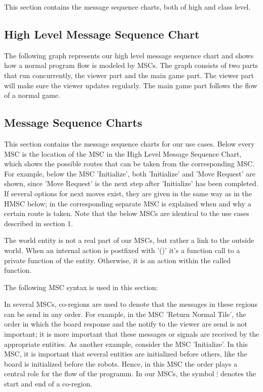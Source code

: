 This section contains the message sequence charts, both of high and class level.
\subsection{High Level Message Sequence Chart}
	
	\begin{minipage}{\linewidth}
		The following graph represents our high level message sequence chart and shows how a normal program flow is modeled by MSCs. The graph consists of two parts that run concurrently, the viewer part and the main game part. The viewer part will make sure the viewer updates regularly. The main game part follows the flow of a normal game.
		
			
	\end{minipage}
	\newpage
\subsection{Message Sequence Charts}
	This section contains the message sequence charts for our use cases. Below every MSC is the location of the MSC in the High Level Message Sequence Chart, which shows the possible routes that can be taken from the corresponding MSC. For example, below the MSC 'Initialize', both 'Initialize' and 'Move Request' are shown, since 'Move Request' is the next step after 'Initialize' has been completed. If several options for next moves exist, they are given in the same way as in the HMSC below; in the corresponding separate MSC is explained when and why a certain route is taken. Note that the below MSCs are identical to the use cases described in section 1.

	The world entity is not a real part of our MSCs, but rather a link to the outside world. When an internal action is postfixed with '()' it's a function call to a private function of the entity. Otherwise, it is an action within the called function.

	The following MSC syntax is used in this section:

	

	In several MSCs, co-regions are used to denote that the messages in these regions can be send in any order. For example, in the MSC 'Return Normal Tile', the order in which the board response and the notify to the viewer are send is not important; it is more important that these messages or signals are received by the appropriate entities. As another example, consider the MSC 'Initialize'. In this MSC, it is important that several entities are initialized before others, like the board is initialized before the robots. Hence, in this MSC the order plays a central role for the flow of the programm. In our MSCs, the symbol $\vdots$ denotes the start and end of a co-region.

